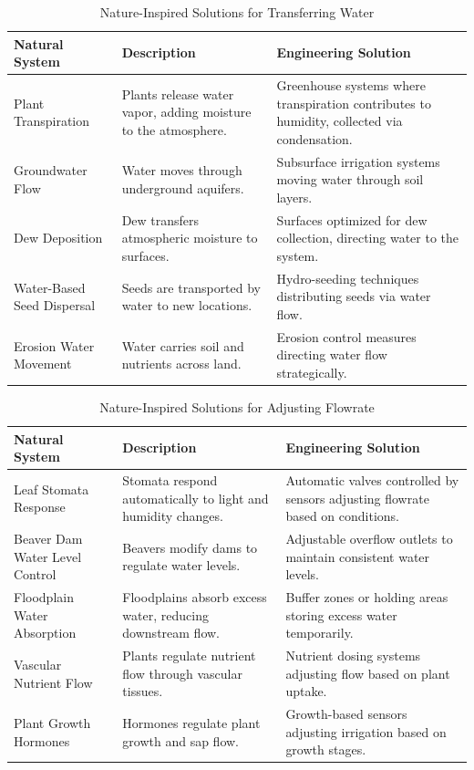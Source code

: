 \documentclass[12pt]{article}
\begin{document}
\begin{table}[h!]
    \centering
    \caption{Nature-Inspired Solutions for Transferring Water}
    \begin{tabular}{p{4cm} p{5.5cm} p{5.5cm}}
        \toprule
        \textbf{Natural System} & \textbf{Description} & \textbf{Engineering Solution} \\
        \midrule
        Plant Transpiration & Plants release water vapor, adding moisture to the atmosphere. & Greenhouse systems where transpiration contributes to humidity, collected via condensation. \\
        Groundwater Flow & Water moves through underground aquifers. & Subsurface irrigation systems moving water through soil layers. \\
        Dew Deposition & Dew transfers atmospheric moisture to surfaces. & Surfaces optimized for dew collection, directing water to the system. \\
        Water-Based Seed Dispersal & Seeds are transported by water to new locations. & Hydro-seeding techniques distributing seeds via water flow. \\
        Erosion Water Movement & Water carries soil and nutrients across land. & Erosion control measures directing water flow strategically. \\
        \bottomrule
    \end{tabular}
    \label{tab:transfers_water}
\end{table}

\begin{table}[h!]
    \centering
    \caption{Nature-Inspired Solutions for Adjusting Flowrate}
    \begin{tabular}{p{4cm} p{5.5cm} p{5.5cm}}
        \toprule
        \textbf{Natural System} & \textbf{Description} & \textbf{Engineering Solution} \\
        \midrule
        Leaf Stomata Response & Stomata respond automatically to light and humidity changes. & Automatic valves controlled by sensors adjusting flowrate based on conditions. \\
        Beaver Dam Water Level Control & Beavers modify dams to regulate water levels. & Adjustable overflow outlets to maintain consistent water levels. \\
        Floodplain Water Absorption & Floodplains absorb excess water, reducing downstream flow. & Buffer zones or holding areas storing excess water temporarily. \\
        Vascular Nutrient Flow & Plants regulate nutrient flow through vascular tissues. & Nutrient dosing systems adjusting flow based on plant uptake. \\
        Plant Growth Hormones & Hormones regulate plant growth and sap flow. & Growth-based sensors adjusting irrigation based on growth stages. \\
        \bottomrule
    \end{tabular}
    \label{tab:adjust_flowrate}
\end{table}
\end{document}
